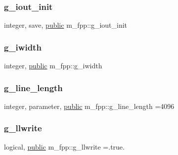\mbox{\label{namespacem__fpp_ac2149360808b5ac936e0cbfa075c0099}} 
\subsubsection{\texorpdfstring{g\+\_\+iout\+\_\+init}{g\_iout\_init}}
{\footnotesize\ttfamily integer, save, \hyperlink{M__stopwatch_83_8txt_a2f74811300c361e53b430611a7d1769f}{public} m\+\_\+fpp\+::g\+\_\+iout\+\_\+init}

\mbox{\label{namespacem__fpp_a2dcc2372199e7d3cb6e318948cbd77c0}} 
\subsubsection{\texorpdfstring{g\+\_\+iwidth}{g\_iwidth}}
{\footnotesize\ttfamily integer, \hyperlink{M__stopwatch_83_8txt_a2f74811300c361e53b430611a7d1769f}{public} m\+\_\+fpp\+::g\+\_\+iwidth}

\mbox{\label{namespacem__fpp_ab93f8756cf248cf8db932573009d4664}} 
\subsubsection{\texorpdfstring{g\+\_\+line\+\_\+length}{g\_line\_length}}
{\footnotesize\ttfamily integer, parameter, \hyperlink{M__stopwatch_83_8txt_a2f74811300c361e53b430611a7d1769f}{public} m\+\_\+fpp\+::g\+\_\+line\+\_\+length =4096}

\mbox{\label{namespacem__fpp_a5939800574631e8265956e2bc2224a9f}} 
\subsubsection{\texorpdfstring{g\+\_\+llwrite}{g\_llwrite}}
{\footnotesize\ttfamily logical, \hyperlink{M__stopwatch_83_8txt_a2f74811300c361e53b430611a7d1769f}{public} m\+\_\+fpp\+::g\+\_\+llwrite =.true.}

